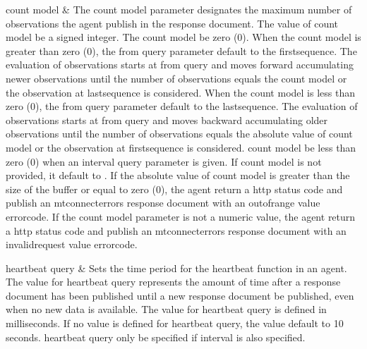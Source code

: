 \begin{longtabu}
\gls{count model}
&
The \gls{count model} parameter designates the maximum number of \glspl{observation} the \gls{agent} \MUST publish in the \gls{response document}.
\newline The value of \gls{count model} \MUST be a signed integer.
\newline The \gls{count model} \MUSTNOT be zero (0).
\newline When the \gls{count model} is greater than zero (0), the \gls{from query} parameter \MUST default to the \gls{firstsequence}. The evaluation of \glspl{observation} starts at \gls{from query} and moves forward accumulating newer \glspl{observation} until the number of \glspl{observation} equals the \gls{count model} or the  \gls{observation} at \gls{lastsequence} is considered.
\newline When the \gls{count model} is less than zero (0), the \gls{from query} parameter \MUST  default to the \gls{lastsequence}. The evaluation of \glspl{observation} starts at \gls{from query} and moves backward accumulating older \glspl{observation} until the number of \glspl{observation} equals the absolute value of \gls{count model} or the \gls{observation} at \gls{firstsequence} is considered.
\newline \gls{count model} \MUSTNOT be less than zero (0) when an \gls{interval query} parameter is given.
\newline If \gls{count model} is not provided, it \MUST default to .
\newline If the absolute value of \gls{count model} is greater than the size of the \gls{buffer} or equal to zero (0), the \gls{agent} \MUST return a  \gls{http status code} and \MUST publish an \gls{mtconnecterrors response document} with an \gls{outofrange value}  \gls{errorcode}.
\newline If the \gls{count model} parameter is not a numeric value, the \gls{agent} \MUST return a  \gls{http status code} and \MUST publish an \gls{mtconnecterrors response document} with an \gls{invalidrequest value}  \gls{errorcode}. \\
\hline

\gls{heartbeat query}
&
Sets the time period for the \gls{heartbeat} function in an \gls{agent}.
\newline The value for \gls{heartbeat query} represents the amount of time after a \gls{response document} has been published until a new \gls{response document} \MUST be published, even when no new data is available.  
\newline The value for \gls{heartbeat query} is defined in milliseconds.
\newline If no value is defined for \gls{heartbeat query}, the value \SHOULD default to 10 seconds.
\newline \gls{heartbeat query} \MUST only be specified if interval is also specified.
\\ \hline


\end{longtabu}
